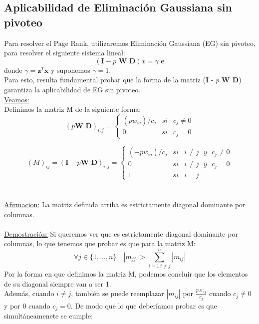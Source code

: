 \subsection{Aplicabilidad de Eliminación Gaussiana sin pivoteo}
Para resolver el Page Rank, utilizaremos Eliminación Gaussiana (EG) sin pivoteo, para resolver el siguiente sistema lineal:
\begin{equation*}
(\textbf{I} - \textit{p } \textbf{W D}) x = \gamma \textbf{ e}
\end{equation*}
donde $\gamma = \textbf{z}^T \textbf{x}$ y suponemos $\gamma = 1$.	\\
Para esto, resulta fundamental probar que la forma de la matriz (\textbf{I} - \textit{p} \textbf{W D}) garantiza la aplicabilidad de EG sin pivoteo.\\
\underline{Veamos:} \\
Definimos la matriz M de la siguiente forma:
\begin{equation*}
(\textit{p} \textbf{W D})_{i,j} = \left\{ \begin{array}{lcc}
 (p w_{ij})/ c_{j}  &si& c_{j} \neq 0
\\ 0 &si& c_{j} = 0
\end{array}
\right.
\end{equation*}

\begin{equation*}
(M)_{ij}=(\textbf{I} - \textit{p} \textbf{W D})_{i,j} = \left\{ \begin{array}{lcc}
 (-p w_{ij})/ c_{j}  &si& i \neq j \:\:\: y  \:\:\: c_{j} \neq 0
\\ 0 &si& i \neq j \:\:\: y  \:\:\: c_{j} = 0
\\ 1 &si& i = j
\end{array}
\right.
\end{equation*}
 \\
 \\
\underline{Afirmacion:} La matriz definida arriba es estrictamente diagonal dominante por columnas.\\
 \\
\underline{Demostraci\'on:} Si queremos ver que es estrictamente diagonal dominante por columnas, lo que tenemos que probar es que para la matriz M:
\begin{equation*}
\forall j \in \lbrace 1,...,n \rbrace \quad \left| { m }_{ jj } \right| >\displaystyle \sum _{ i = 1\ i \neq  j }^{ n }{ \left| { m }_{ ij } \right|  }
\end{equation*}
Por la forma en que definimos la matriz M, podemos concluir que los elementos de su diagonal siempre van a ser 1.\\
Adem\'as, cuando $i \neq j$, tambi\'en se puede reemplazar $|m_{ij}|$ por $\frac{p.w_{ij}}{c_{j}}$ cuando $c_{j} \neq 0$ y por $0$ cuando $c_{j} = 0$. De modo que lo que deber\'iamos probar es que simult\'aneamenete se cumple:

